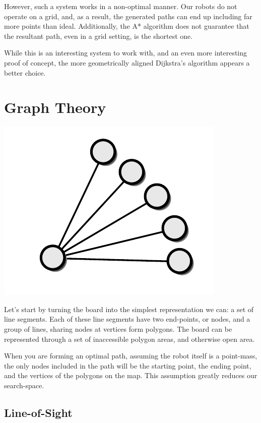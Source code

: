\documentclass[letterpaper, 12pt]{article}
\begin{document}
\begin{multicols}{2}
However, such a system works in a non-optimal manner. Our robots do not operate
on a grid, and, as a result, the generated paths can end up including far more
points than ideal. Additionally, the A* algorithm does not guarantee that the
resultant path, even in a grid setting, is the shortest one.

While this is an interesting system to work with, and an even more interesting
proof of concept, the more geometrically aligned Dijkstra's algorithm appears a
better choice.

\section{Graph Theory}

\includegraphics[width=\columnwidth]{img/graph_theory.pdf}

Let's start by turning the board into the simplest representation we can: a set
of line segments. Each of these line segments have two end-points, or nodes, and
a group of lines, sharing nodes at vertices form polygons. The board can be
represented through a set of inaccessible polygon areas, and otherwise open
area.

When you are forming an optimal path, assuming the robot itself is a point-mass,
the only nodes included in the path will be the starting point, the ending
point, and the vertices of the polygons on the map. This assumption greatly
reduces our search-space.

\subsection{Line-of-Sight}


\end{multicols}
\end{document}
